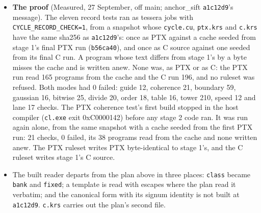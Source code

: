 \begin{enumerate}
\begin{itemize}
\begin{enumerate}
\begin{itemize}
\begin{itemize}
\item \textbf{The proof} (Measured, 27 September, off main; anchor\_\allowbreak{}sift \texttt{a1c12d9}'s message). The eleven record tests ran as tessera jobs with \texttt{CYCLE\_\allowbreak{}RECORD\_\allowbreak{}CHECK=1}, from a snapshot whose \texttt{cycle.\allowbreak{}cu}, \texttt{ptx.\allowbreak{}krs} and \texttt{c.\allowbreak{}krs} have the same sha256 as \texttt{a1c12d9}'s: once as PTX against a cache seeded from stage 1's final PTX run (\texttt{b56ca40}), and once as C source against one seeded from its final C run. A program whose text differs from stage 1's by a byte misses the cache and is written anew. None was, as PTX or as C: the PTX run read 165 programs from the cache and the C run 196, and no ruleset was refused. Both modes had 0 failed: guide 12, coherence 21, boundary 59, gaussian 16, bitwise 25, divide 20, order 18, table 16, tower 210, speed 12 and lane 17 checks. The PTX coherence test's first build stopped in the host compiler (\texttt{cl.\allowbreak{}exe} exit 0xC0000142) before any stage 2 code ran. It was run again alone, from the same snapshot with a cache seeded from the first PTX run: 21 checks, 0 failed, its 38 programs read from the cache and none written anew. The PTX ruleset writes PTX byte-identical to stage 1's, and the C ruleset writes stage 1's C source.
\item The built reader departs from the plan above in three places: \texttt{class} became \texttt{bank} and \texttt{fixed}; a template is read with escapes where the plan read it verbatim; and the canonical form with its signum identity is not built at \texttt{a1c12d9}. \texttt{c.\allowbreak{}krs} carries out the plan's second file.
\end{itemize}

\end{itemize}
\end{enumerate}
\end{itemize}
\end{enumerate}
